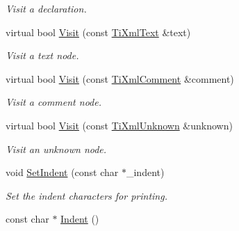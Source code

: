 \begin{DoxyCompactItemize}
\begin{DoxyCompactList}\small\item\em Visit a declaration. \end{DoxyCompactList}\item 
virtual bool \hyperlink{class_ti_xml_printer_a0857c5d32c59b9a257f9a49cb9411df5}{Visit} (const \hyperlink{class_ti_xml_text}{Ti\+Xml\+Text} \&text)\hypertarget{class_ti_xml_printer_a0857c5d32c59b9a257f9a49cb9411df5}{}\label{class_ti_xml_printer_a0857c5d32c59b9a257f9a49cb9411df5}

\begin{DoxyCompactList}\small\item\em Visit a text node. \end{DoxyCompactList}\item 
virtual bool \hyperlink{class_ti_xml_printer_a9870423f5603630e6142f6bdb66dfb57}{Visit} (const \hyperlink{class_ti_xml_comment}{Ti\+Xml\+Comment} \&comment)\hypertarget{class_ti_xml_printer_a9870423f5603630e6142f6bdb66dfb57}{}\label{class_ti_xml_printer_a9870423f5603630e6142f6bdb66dfb57}

\begin{DoxyCompactList}\small\item\em Visit a comment node. \end{DoxyCompactList}\item 
virtual bool \hyperlink{class_ti_xml_printer_a08591a15c9a07afa83c24e08b03d6358}{Visit} (const \hyperlink{class_ti_xml_unknown}{Ti\+Xml\+Unknown} \&unknown)\hypertarget{class_ti_xml_printer_a08591a15c9a07afa83c24e08b03d6358}{}\label{class_ti_xml_printer_a08591a15c9a07afa83c24e08b03d6358}

\begin{DoxyCompactList}\small\item\em Visit an unknown node. \end{DoxyCompactList}\item 
void \hyperlink{class_ti_xml_printer_a213377a4070c7e625bae59716b089e5e}{Set\+Indent} (const char $\ast$\+\_\+indent)
\begin{DoxyCompactList}\small\item\em Set the indent characters for printing. \end{DoxyCompactList}\item 
const char $\ast$ \hyperlink{class_ti_xml_printer_abb33ec7d4bad6aaeb57f4304394b133d}{Indent} ()\hypertarget{class_ti_xml_printer_abb33ec7d4bad6aaeb57f4304394b133d}{}\label{class_ti_xml_printer_abb33ec7d4bad6aaeb57f4304394b133d}


\end{DoxyCompactItemize}
